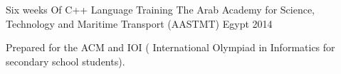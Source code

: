 \begin{cventries}

    \cventry
      {Six weeks Of C++ Language Training} %
      {The Arab Academy for Science, Technology and Maritime Transport (AASTMT)} %
      {Egypt} %
      {2014} %
      {
        \begin{cvitems} %
          \item {Prepared for the ACM and IOI ( International Olympiad in Informatics for secondary school students).}
    \end{cvitems}
      }
  \end{cventries}
